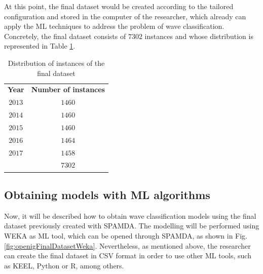\documentclass[review]{elsarticle}
\begin{document}
			At this point, the final dataset would be created according to the tailored configuration and stored in the computer of the researcher, which already can apply the ML techniques to address the problem of wave classification. Concretely, the final dataset consists of $7302$ instances and whose distribution is represented in Table \ref{tab:datasetDistribution}.
			
				\begin{table}[!h]
				
					\caption{Distribution of instances of the final dataset}
					\label{tab:datasetDistribution}
					\centering

					\begin{tabular}{cc}
					
						\cline{1-2}
						
						\textbf{Year}&\textbf{Number of instances}\\
	
						\cline{1-2}
						
						$2013$&$1460$\\
						$2014$&$1460$\\
						$2015$&$1460$\\
						$2016$&$1464$\\
						$2017$&$1458$\\
						
						\cline{1-2}
						
						&$7302$\\
						
						\cline{1-2}
							
					\end{tabular}
				
				\end{table}

		
		\subsection{Obtaining models with ML algorithms}
		
			Now, it will be described how to obtain wave classification models using the final dataset previously created with SPAMDA. The modelling will be performed using WEKA as ML tool, which can be opened through SPAMDA, as shown in Fig. \ref{fig:openigFinalDatasetWeka}. Nevertheless, as mentioned above, the researcher can create the final dataset in CSV format in order to use other ML tools, such as KEEL, Python or R, among others.
			
\end{document}

